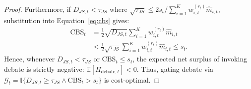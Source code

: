 \documentclass[10pt,a4paper,twocolumn]{article}
\begin{document}
\begin{proof}
Furthermore, if $D_{JS,t} < \tau_{JS}$ where $\sqrt{\tau_{JS}} \le 2 s_t / \sum_{i=1}^K w_{i,t}^{(r_t)} \hat{m}_{i,t}$, substitution into Equation~\eqref{eq:cbs} gives:
\begin{align}
  \text{CBS}_t &= \frac{1}{2} \sqrt{D_{JS,t}} \sum_{i=1}^K w_{i,t}^{(r_t)} \hat{m}_{i,t} \nonumber \\
  &< \frac{1}{2} \sqrt{\tau_{JS}} \sum_{i=1}^K w_{i,t}^{(r_t)} \hat{m}_{i,t} \le s_t.
\end{align}
Hence, whenever $D_{JS,t} < \tau_{JS}$ or $\text{CBS}_t \le s_t$, the expected net surplus of invoking debate is strictly negative: $\mathbb{E}[\Pi_{\text{debate}, t}] < 0$. Thus, gating debate via $\mathcal{G}_t = \mathbb{I}\{D_{JS,t} \ge \tau_{JS} \wedge \text{CBS}_t > s_t\}$ is cost-optimal.
\end{proof}
\end{document}
